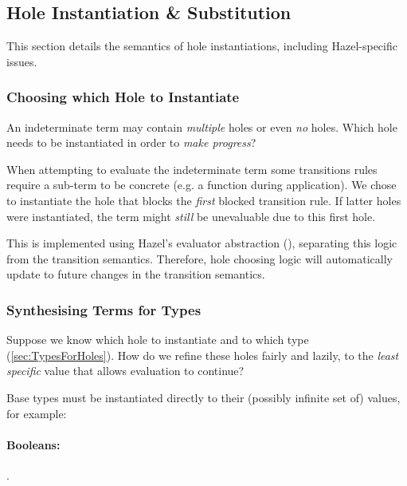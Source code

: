 \subsection{Hole Instantiation \& Substitution}\label{sec:HoleInstantiation}
This section details the semantics of hole instantiations, including Hazel-specific issues.

\subsubsection{Choosing which Hole to Instantiate}
\label{sec:ChooseHole}
An indeterminate term may contain \textit{multiple} holes or even \textit{no} holes. Which hole needs to be instantiated in order to \textit{make progress}?

When attempting to evaluate the indeterminate term some transitions rules require a sub-term to be concrete (e.g. a function during application). We chose to instantiate the hole that blocks the \textit{first} blocked transition rule. If latter holes were instantiated, the term might \textit{still} be unevaluable due to this first hole.

This is implemented using Hazel's evaluator abstraction (), separating this logic from the transition semantics. Therefore, hole choosing logic will automatically update to future changes in the transition semantics.

\subsubsection{Synthesising Terms for Types}
Suppose we know which hole to instantiate and to which type (\cref{sec:TypesForHoles}). How do we refine these holes fairly and lazily, to the \textit{least specific} value that allows evaluation to continue?

Base types must be instantiated directly to their (possibly infinite set of) values, for example:
\paragraph{Booleans:} .
